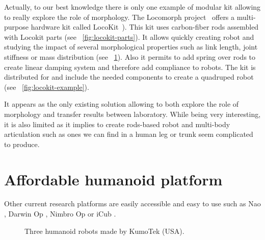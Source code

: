 Actually, to our best knowledge there is only one example of modular kit allowing to really explore the role of morphology. The Locomorph project~\parencite{locomorph} offers a multi-purpose hardware kit called LocoKit~\parencite{larsen2012locokit}). This kit uses carbon-fiber rods assembled with Locokit parts (see \figurename~\ref{fig:locokit-parts}). It allows quickly creating robot and studying the impact of several morphological properties such as link length, joint stiffness or mass distribution (see \figurename~\ref{fig:locokit}). Also it permits to add spring over rods to create linear damping system and therefore add compliance to robots.
The kit is distributed for  and include the needed components to create a quadruped robot (see \figurename~\ref{fig:locokit-example}).

\begin{figure}[tb]
\centering
    \hfil
    \caption{}
    \label{fig:locokit}
\end{figure}

It appears as the only existing solution allowing to both explore the role of morphology and transfer results between laboratory. While being very interesting, it is also limited as it implies to create rods-based robot and multi-body articulation such as ones we can find in a human leg or trunk seem complicated to produce.


\section{Affordable humanoid platform} %
\label{sec:affordable_humanoid_platform}

Other current research platforms are easily accessible and easy to use such as Nao \cite{gouaillier2008nao}, Darwin Op \cite{ha2011development}, Nimbro Op \cite{schwarznimbro} or iCub \cite{metta2008icub}.

\begin{figure}[tb]
\centering
    \hfil
    \hfil
    \caption{Three humanoid robots made by KumoTek (USA).}
    \label{fig:kumotek_robots}
\end{figure}


